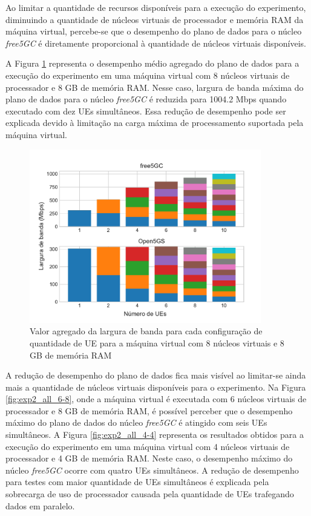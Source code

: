 Ao limitar a quantidade de recursos disponíveis para a execução do experimento, diminuindo a quantidade de núcleos virtuais de processador e memória RAM da máquina virtual, percebe-se que o desempenho do plano de dados para o núcleo \textit{free5GC} é diretamente proporcional à quantidade de núcleos virtuais disponíveis.

A Figura \ref{fig:exp2_all_8-8} representa o desempenho médio agregado do plano de dados para a execução do experimento em uma máquina virtual com 8 núcleos virtuais de processador e 8 GB de memória RAM.
Nesse caso, largura de banda máxima do plano de dados para o núcleo \textit{free5GC} é reduzida para 1004.2 Mbps quando executado com dez UEs simultâneos.
Essa redução de desempenho pode ser explicada devido à limitação na carga máxima de processamento suportada pela máquina virtual.

\begin{figure}[!h]
    \centering
    \includegraphics[width=0.9\textwidth]{TG2/Chapters/DataAnalysis/Figures/EXP2-ALL-8C-8GB.pdf}
    \caption{Valor agregado da largura de banda para cada configuração de quantidade de UE para a máquina virtual com 8 núcleos virtuais e 8 GB de memória RAM}
    \label{fig:exp2_all_8-8}
\end{figure}

A redução de desempenho do plano de dados fica mais visível ao limitar-se ainda mais a quantidade de núcleos virtuais disponíveis para o experimento.
Na Figura \ref{fig:exp2_all_6-8}, onde a máquina virtual é executada com 6 núcleos virtuais de processador e 8 GB de memória RAM, é possível perceber que o desempenho máximo do plano de dados do núcleo \textit{free5GC} é atingido com seis UEs simultâneos.
A Figura \ref{fig:exp2_all_4-4} representa os resultados obtidos para a execução do experimento em uma máquina virtual com 4 núcleos virtuais de processador e 4 GB de memória RAM. Neste caso, o desempenho máximo do núcleo \textit{free5GC} ocorre com quatro UEs simultâneos. 
A redução de desempenho para testes com maior quantidade de UEs simultâneos é explicada pela sobrecarga de uso de processador causada pela quantidade de UEs trafegando dados em paralelo.

